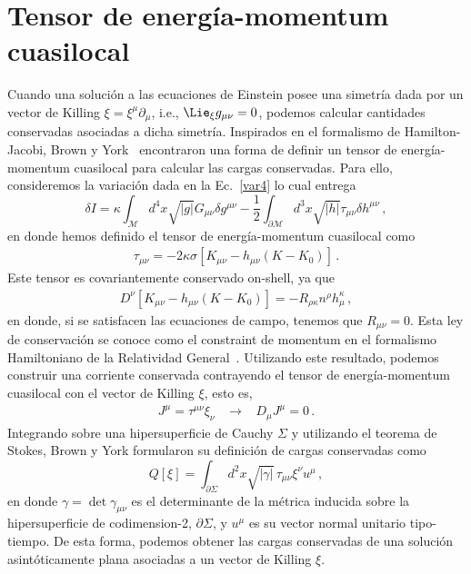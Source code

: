 \documentclass[../Main.tex]{subfiles}
\begin{document}
\section{Tensor de energía-momentum cuasilocal \label{sec:BY}} 
Cuando una solución a las ecuaciones de Einstein posee una simetría dada por un vector de Killing $\xi=\xi^{\mu}\partial_{\mu}$, i.e., $\Lie_{\xi}g_{\mu\nu}=0$, podemos calcular cantidades conservadas asociadas a dicha simetría. Inspirados en el formalismo de Hamilton-Jacobi, Brown y York~\cite{Brown:1992br} encontraron una forma de definir un tensor de energía-momentum cuasilocal para calcular las cargas conservadas. Para ello, consideremos la variación dada en la Ec.~\eqref{var4} lo cual entrega
\begin{equation}
\delta I=\kappa\int_{\mathcal{M}}d^{4}x \sqrt{\lvert g\rvert} G_{\mu\nu}\delta g^{\mu\nu}-\frac{1}{2}\int_{\partial\mathcal{M}}d^{3}x \sqrt{\lvert h\rvert}\tau_{\mu\nu}\delta h^{\mu\nu} \, ,
\end{equation}
en donde hemos definido el tensor de energía-momentum cuasilocal como
\begin{eqnarray}
\tau_{\mu\nu}=-2\kappa\sigma\left[K_{\mu\nu}-h_{\mu\nu}(K-K_{0})\right] \, . \label{tau}
\end{eqnarray}
Este tensor es covariantemente conservado on-shell, ya que
\begin{align}
    D^{\nu}[K_{\mu\nu}-h_{\mu\nu}(K-K_{0})]=-R_{\rho\kappa}n^{\rho}h^{\kappa}_{\mu}\, ,
\end{align}
en donde, si se satisfacen las ecuaciones de campo, tenemos que $R_{\mu\nu}=0$. Esta ley de conservación se conoce como el constraint de momentum en el formalismo Hamiltoniano de la Relatividad General~\cite{Brown:1992br}. Utilizando este resultado,  podemos construir una corriente conservada contrayendo el tensor de energía-momentum cuasilocal con el vector de Killing $\xi$, esto es, 
\begin{align}
    J^{\mu}=\tau^{\mu\nu}\xi_{\nu} \;\;\; \to \;\;\; D_{\mu}J^{\mu}=0\, .
\end{align}
Integrando sobre una hipersuperficie de Cauchy $\Sigma$ y utilizando el teorema de Stokes, Brown y York formularon su definición de cargas conservadas como
\begin{equation}
  Q[\xi]=\int_{\partial\Sigma} d^{2}x \sqrt{\lvert \gamma \rvert}\, \tau_{\mu\nu}\xi^{\nu}u^{\mu} \, , \label{qby}
\end{equation}
en donde $\gamma=\det\gamma_{\mu\nu}$ es el determinante de la métrica inducida sobre la hipersuperficie de codimension-2, $\partial\Sigma$, y $u^{\mu}$ es su vector normal unitario tipo-tiempo. De esta forma, podemos obtener las cargas conservadas de una solución asintóticamente plana asociadas a un vector de Killing $\xi$.
\end{document}
